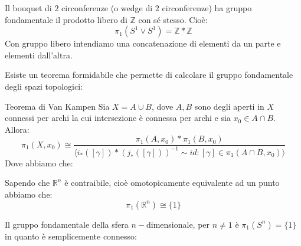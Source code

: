 \documentclass[11pt, a4paper, twoside]{article}
\begin{document}
\begin{es}[$S^1 \vee S^1$]
	Il bouquet di $2$ circonferenze (o wedge di $2$ circonferenze) ha gruppo fondamentale il prodotto libero di $\mathbb Z$ con sé stesso. Cioè:
	\[ \pi_1(S^1 \vee S^1) = \mathbb Z * \mathbb Z \]
	Con gruppo libero intendiamo una concatenazione di elementi da un parte e elementi dall'altra.
\end{es}

Esiste un teorema formidabile che permette di calcolare il gruppo fondamentale degli spazi topologici:

\begin{thm}{Teorema di Van Kampen}{}
	Sia $X = A\cup B$, dove $A,B$ sono degli aperti in $X$ connessi per archi la cui intersezione è connessa per archi e sia $x_0 \in A \cap B$. Allora:
	\[ \pi_1(X, x_0) \cong \frac{\pi_1(A, x_0) * \pi_1(B, x_0)}{\langle i_*([\gamma])*(j_*([\gamma]))^{-1} \sim id : [\gamma] \in \pi_1(A \cap B, x_0) \rangle} \]
	Dove abbiamo che:
	\begin{center}
	\end{center}
\end{thm}

\begin{es}[$\mathbb R^n$]
	Sapendo che $\mathbb R^n$ è contraibile, cioè omotopicamente equivalente ad un punto abbiamo che:
	\[ \pi_1(\mathbb R^n) \cong \{1\} \]
\end{es}

\begin{es}[$S^n, n\geq 2$]
	Il gruppo fondamentale della sfera $n-$dimensionale, per $n\neq 1$ è $\pi_1(S^n) = \{1\}$ in quanto è semplicemente connesso:
	\begin{center}
	\end{center}
\end{es}
\end{document}
